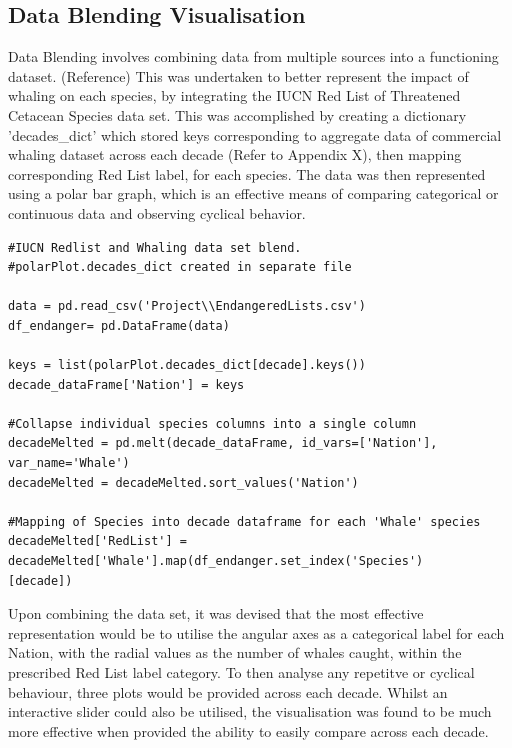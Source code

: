 \documentclass[12pt,a4paper]{article}
\begin{document}
\subsection{Data Blending Visualisation}
Data Blending involves combining data from multiple sources into a functioning dataset.  (Reference) This was undertaken to better represent the impact of whaling on each species, by integrating the IUCN Red List of Threatened Cetacean Species data set.  This was accomplished by creating a dictionary 'decades\_dict' which stored keys corresponding to aggregate data of commercial whaling dataset across each decade (Refer to Appendix X), then mapping corresponding Red List label, for each species. The data was then represented using a polar bar graph, which is an effective means of comparing categorical or continuous data and observing cyclical behavior.

\begin{verbatim}
#IUCN Redlist and Whaling data set blend. 
#polarPlot.decades_dict created in separate file 

data = pd.read_csv('Project\\EndangeredLists.csv')
df_endanger= pd.DataFrame(data)

keys = list(polarPlot.decades_dict[decade].keys())
decade_dataFrame['Nation'] = keys

#Collapse individual species columns into a single column
decadeMelted = pd.melt(decade_dataFrame, id_vars=['Nation'], var_name='Whale')
decadeMelted = decadeMelted.sort_values('Nation')

#Mapping of Species into decade dataframe for each 'Whale' species
decadeMelted['RedList'] = decadeMelted['Whale'].map(df_endanger.set_index('Species')
[decade])
\end{verbatim}


Upon combining the data set, it was devised that the most effective representation would be to utilise the angular axes as a categorical label for each Nation, with the radial values as the number of whales caught, within the prescribed Red List label category. To then analyse any repetitve or cyclical behaviour, three plots would be provided across each decade. Whilst an interactive slider could also be utilised, the visualisation was found to be much more effective when provided the ability to easily compare across each decade. 
\end{document}
